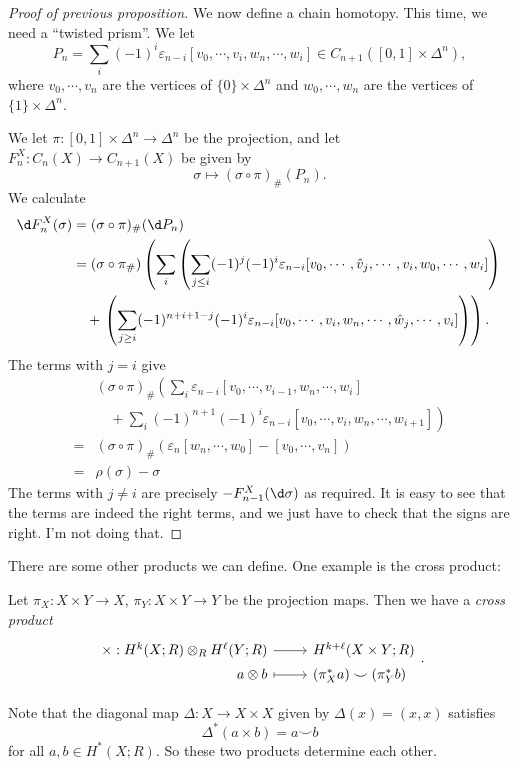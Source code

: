 \documentclass[a4paper]{article}
\theoremstyle{definition}
\begin{document}
\begin{proof}[Proof of previous proposition]
  We now define a chain homotopy. This time, we need a ``twisted prism''. We let
  \[
    P_n = \sum_i (-1)^i \varepsilon_{n - i} [v_0, \cdots, v_i, w_n, \cdots, w_i] \in C_{n + 1}([0, 1] \times \Delta^n),
  \]
  where $v_0, \cdots, v_n$ are the vertices of $\{0\} \times \Delta^n$ and $w_0, \cdots, w_n$ are the vertices of $\{1\} \times \Delta^n$.

  We let $\pi: [0, 1] \times \Delta^n \to \Delta^n$ be the projection, and let $F_n^X: C_n(X) \to C_{n + 1}(X)$ be given by
  \[
    \sigma \mapsto (\sigma \circ \pi)_\#(P_n).
  \]
  We calculate
  \begin{align*}
    \d F_n^X(\sigma) &= (\sigma \circ \pi)_\#(\d P_n) \\
    &= (\sigma \circ \pi_\#)\left(\sum_i \left(\sum_{j \leq i}(-1)^j (-1)^i \varepsilon_{n - i}[v_0, \cdots, \hat{v}_j, \cdots, v_i, w_0, \cdots, w_i]\right)\right.\\
    &\quad +\left.\left(\sum_{j \geq i} (-1)^{n + i + 1 - j}(-1)^i \varepsilon_{n - i}[v_0, \cdots, v_i, w_n, \cdots, \hat{w}_j, \cdots, v_i]\right)\right).
  \end{align*}
  The terms with $j = i$ give
  \begin{align*}
    &(\sigma \circ \pi)_\#\left(\sum_i \varepsilon_{n - i}[v_0, \cdots, v_{i - 1}, w_n, \cdots, w_i]\right. \\
    &\quad+ \left.\sum_i (-1)^{n + 1}(-1)^i \varepsilon_{n - i}[v_0, \cdots, v_i, w_n,\cdots, w_{i + 1}]\right)\\
    ={}& (\sigma \circ \pi)_\#(\varepsilon_n[w_n,\cdots, w_0] - [v_0, \cdots, v_n])\\
    ={}& \rho(\sigma) - \sigma
  \end{align*}
  The terms with $j \not= i$ are precisely $-F_{n - 1}^X (\d \sigma)$ as required. It is easy to see that the terms are indeed the right terms, and we just have to check that the signs are right. I'm not doing that.
\end{proof}

There are some other products we can define. One example is the cross product:
\begin{defi}
  Let $\pi_X: X \times Y \to X$, $\pi_Y: X \times Y\to Y$ be the projection maps. Then we have a \emph{cross product}
  \[
    \begin{tikzcd}[row sep = 0ex
        ,/tikz/column 1/.append style={anchor=base east}
        ,/tikz/column 2/.append style={anchor=base west}
      ]
      \times: H^k(X; R) \otimes_R H^\ell(Y; R) \ar[r] & H^{k + \ell}(X \times Y; R)\\
      a \otimes b \ar[r, maps to] & (\pi_X^* a) \smile (\pi_Y^* b)
    \end{tikzcd}.
  \]
\end{defi}
Note that the diagonal map $\Delta: X \to X \times X$ given by $\Delta(x) = (x, x)$ satisfies
\[
  \Delta^*(a \times b) = a \smile b
\]
for all $a, b \in H^*(X; R)$. So these two products determine each other.
\end{document}
